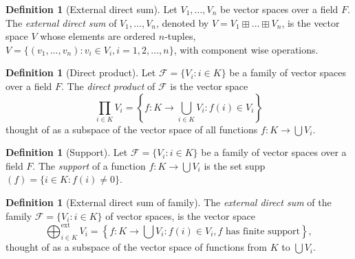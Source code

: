 \documentclass[12pt]{article}
\theoremstyle{definition}
\newtheorem{definition}[theorem]{Definition}
\begin{document}
\begin{definition}[External direct sum]
    Let $V_1,\dots,V_n$ be vector spaces over a field $F$. The \textit{external direct sum} of $V_1,\dots,V_n$, denoted by $V=V_1\boxplus\dots\boxplus V_n$, is the vector space $V$ whose elements are ordered $n$-tuples, $V=\{(v_1,\dots,v_n): v_i\in V_i, i=1,2,\dots,n\}$, with component wise operations.
\end{definition}
\begin{definition}[Direct product]
    Let $\mathcal{F}=\{V_i:i\in K\}$ be a family of vector spaces over a field $F$. The \textit{direct product} of $\mathcal{F}$ is the vector space
    \begin{equation*}
        \prod_{i\in K} V_i=\left\{f:K\to\bigcup_{i\in K} V_i : f(i)\in V_i \right\}
    \end{equation*}
    thought of as a subspace of the vector space of all functions $f:K\to\bigcup V_i$.
\end{definition}
\begin{definition}[Support]
    Let $\mathcal{F}=\{V_i:i\in K\}$ be a family of vector spaces over a field $F$. The \textit{support} of a function $f:K\to\bigcup V_i$ is the set supp$(f)=\{i\in K: f(i)\neq 0\}$.
\end{definition}
\begin{definition}[External direct sum of family]
    The \textit{external direct sum} of the family $\mathcal{F}=\{V_i:i\in K\}$ of vector spaces, is the vector space
    \begin{equation*}
        \bigoplus_{i\in K}^\text{ext}V_i=\left\{f:K\to \bigcup V_i: f(i)\in V_i, f\text{ has finite support} \right\},
    \end{equation*}
    thought of as a subspace of the vector space of functions from $K$ to $\bigcup V_i$.
\end{definition}
\end{document}
